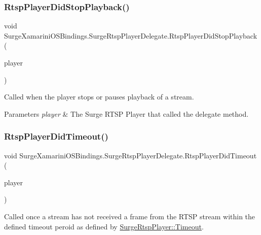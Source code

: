 \subsubsection{\texorpdfstring{Rtsp\+Player\+Did\+Stop\+Playback()}{RtspPlayerDidStopPlayback()}}
{\footnotesize\ttfamily void Surge\+Xamarini\+O\+S\+Bindings.\+Surge\+Rtsp\+Player\+Delegate.\+Rtsp\+Player\+Did\+Stop\+Playback (\begin{DoxyParamCaption}\item[{\hyperlink{interface_surge_xamarini_o_s_bindings_1_1_surge_rtsp_player}{Surge\+Rtsp\+Player}}]{player }\end{DoxyParamCaption})}



Called when the player stops or pauses playback of a stream. 


\begin{DoxyParams}{Parameters}
{\em player} & The Surge R\+T\+SP Player that called the delegate method.\\
\hline
\end{DoxyParams}
\mbox{\label{interface_surge_xamarini_o_s_bindings_1_1_surge_rtsp_player_delegate_a090498b65f3da84477fc9486e24235a4}} 
\subsubsection{\texorpdfstring{Rtsp\+Player\+Did\+Timeout()}{RtspPlayerDidTimeout()}}
{\footnotesize\ttfamily void Surge\+Xamarini\+O\+S\+Bindings.\+Surge\+Rtsp\+Player\+Delegate.\+Rtsp\+Player\+Did\+Timeout (\begin{DoxyParamCaption}\item[{\hyperlink{interface_surge_xamarini_o_s_bindings_1_1_surge_rtsp_player}{Surge\+Rtsp\+Player}}]{player }\end{DoxyParamCaption})}



Called once a stream has not received a frame from the R\+T\+SP stream within the defined timeout peroid as defined by \hyperlink{interface_surge_xamarini_o_s_bindings_1_1_surge_rtsp_player_a5d41ebac63bbd4c26859615abcf1fa0e}{Surge\+Rtsp\+Player\+::\+Timeout}. 


